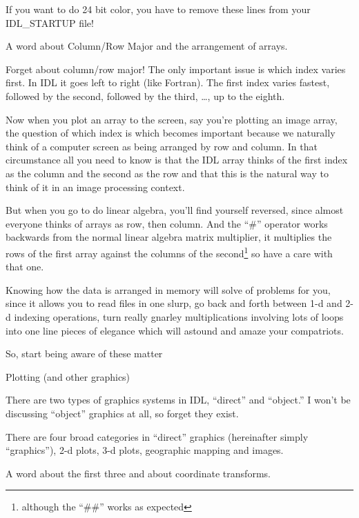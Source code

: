\documentclass{article}
\begin{document}
     If you want to do 24 bit color, you have to remove these lines from
     your IDL\_STARTUP file!

  \ei

  \item A word about Column/Row Major and the arrangement of arrays.

   Forget about column/row major! The only important issue is which
   index varies first. In IDL it goes left to right (like
   Fortran). The first index varies fastest, followed by the second,
   followed by the third, \ldots , up to the eighth.

   Now when you plot an array to the screen, say you're plotting an
   image array, the question of which index is which becomes important
   because we naturally think of a computer screen as being arranged
   by row and column. In that circumstance all you need to know is
   that the IDL array thinks of the first index as the column and the
   second as the row and that this is the natural way to think of it
   in an image processing context.

   But when you go to do linear algebra, you'll find yourself
   reversed, since almost everyone thinks of arrays as row, then
   column. And the ``\#'' operator works backwards from the normal
   linear algebra matrix multiplier, it multiplies the rows of the
   first array against the columns of the second\footnote{although the
   ``\#\#'' works as expected} so have a care with that one.

   Knowing how the data is arranged in memory will solve 
   of problems for you, since it allows you to read files in one
   slurp, go back and forth between 1-d  and 2-d indexing operations,
   turn really gnarley multiplications involving lots of loops into
   one line pieces of elegance which will astound and amaze your
   compatriots.

   So, start being aware of these matter 

  \item Plotting (and other graphics)

   There are two types of graphics systems in IDL, ``direct'' and
  ``object.'' I won't be discussing ``object'' graphics at all, so forget
  they exist.

  There are four broad categories in ``direct'' graphics (hereinafter
  simply ``graphics''), 2-d plots, 3-d plots, geographic mapping and
  images.

  A word about the first three and about coordinate transforms.
\end{document}
